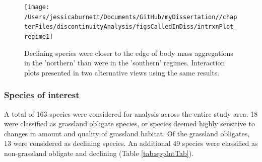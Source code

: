 \documentclass[12pt,twoside,openany]{reedthesis}
\begin{document}
\begin{figure}
\texttt{[image: /Users/jessicaburnett/Documents/GitHub/myDissertation//chapterFiles/discontinuityAnalysis/figsCalledInDiss/intrxnPlot\_regime1]} \caption{Declining species were closer to the edge of body mass aggregations in the 'northern' than were in the 'southern' regimes. Interaction plots presented in two alternative views using the same results.}\label{fig:intrxnPlot-regime}
\end{figure}
\hypertarget{species-of-interest}{%
\subsubsection{Species of interest}\label{species-of-interest}}

A total of 163 species were considered for analysis across the entire study area. 18 were classified as grassland obligate species, or species deemed highly sensitive to changes in amount and quality of grassland habitat. Of the grassland obligates, 13 were considered as declining species. An additional 49 species were classified as non-grassland obligate and declining (Table \ref{tab:sppIntTab}).
\end{document}
